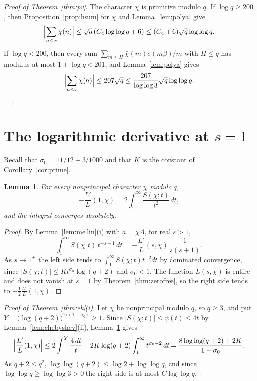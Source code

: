 \documentclass[screen,reqno]{aomart}
\numberwithin{equation}{section}
\newtheorem{lemma}[theorem]{Lemma}
\theoremstyle{definition}
\begin{document}
\begin{proof}[Proof of Theorem~\ref{thm:pv}]
The character $\bar\chi$ is primitive modulo $q$. If $\log q\ge200$, then
Proposition~\ref{prop:hsum} for $\bar\chi$ and Lemma~\ref{lem:polya} give
\[
  \Bigl|\sum_{n\le x}\chi(n)\Bigr|\le\sqrt q\,(C_4\log\log q+6)\le(C_4+6)\sqrt q\log\log q.
\]
If $\log q<200$, then every sum $\sum_{m\le H}\bar\chi(m)e(m\beta)/m$ with $H\le q$ has modulus at
most $1+\log q<201$, and Lemma~\ref{lem:polya} gives
\[
  \Bigl|\sum_{n\le x}\chi(n)\Bigr|\le207\sqrt q\le\frac{207}{\log\log3}\sqrt q\log\log q.\qedhere
\]
\end{proof}

\section{The logarithmic derivative at \texorpdfstring{$s=1$}{s=1}}\label{sec:ek}

Recall that $\sigma_0=11/12+3/1000$ and that $K$ is the constant of Corollary~\ref{cor:prime}.

\begin{lemma}\label{lem:atone}
For every nonprincipal character $\chi$ modulo $q$,
\[
  -\frac{L'}{L}(1,\chi)=2\int_1^\infty\frac{S(\chi;t)}{t^2}\,dt,
\]
and the integral converges absolutely.
\end{lemma}

\begin{proof}
By Lemma~\ref{lem:mellin}(i) with $a=\chi\Lambda$, for real $s>1$,
\[
  \int_1^\infty S(\chi;t)\,t^{-s-1}\,dt=-\frac{L'}{L}(s,\chi)\,\frac1{s(s+1)}.
\]
As $s\to1^+$ the left side tends to $\int_1^\infty S(\chi;t)t^{-2}dt$ by dominated convergence,
since $|S(\chi;t)|\le Kt^{\sigma_0}\log(q+2)$ and $\sigma_0<1$. The function $L(s,\chi)$ is
entire and does not vanish at $s=1$ by Theorem~\ref{thm:zerofree}, so the right side tends to
$-\frac12\frac{L'}{L}(1,\chi)$.
\end{proof}

\begin{proof}[Proof of Theorem~\ref{thm:ek}(i)]
Let $\chi$ be nonprincipal modulo $q$, so $q\ge3$, and put
$Y=\bigl(\log(q+2)\bigr)^{1/(1-\sigma_0)}\ge1$. Since $|S(\chi;t)|\le\psi(t)\le4t$ by
Lemma~\ref{lem:chebyshev}(ii), Lemma~\ref{lem:atone} gives
\[
  \Bigl|\frac{L'}{L}(1,\chi)\Bigr|\le2\int_1^Y\frac{4\,dt}t
  +2K\log(q+2)\int_Y^\infty t^{\sigma_0-2}\,dt
  =\frac{8\log\log(q+2)+2K}{1-\sigma_0}.
\]
As $q+2\le q^2$, $\log\log(q+2)\le\log2+\log\log q$, and since $\log\log q\ge\log\log3>0$ the
right side is at most $C\log\log q$.
\end{proof}
\end{document}
